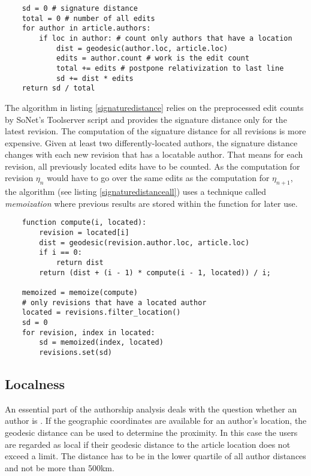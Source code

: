 \begin{lstlisting}
	sd = 0 # signature distance
	total = 0 # number of all edits
	for author in article.authors:
		if loc in author: # count only authors that have a location
			dist = geodesic(author.loc, article.loc)
			edits = author.count # work is the edit count
			total += edits # postpone relativization to last line 
			sd += dist * edits
	return sd / total
\end{lstlisting}

The algorithm in listing \ref{signaturedistance} relies on the preprocessed edit counts by SoNet's Toolserver script and provides the signature distance only for the latest revision. 
The computation of the signature distance for all revisions is more expensive.
Given at least two differently-located authors, the signature distance changes with each new revision that has a locatable author.
That means for each revision, all previously located edits have to be counted.
As the computation for revision $\eta_{n}$ would have to go over the same edits as the computation for $\eta_{n+1}$, the algorithm (see listing \ref{signaturedistanceall}) uses a technique called \emph{memoization} where previous results are stored within the function for later use.

\begin{lstlisting}
	function compute(i, located):
		revision = located[i]
		dist = geodesic(revision.author.loc, article.loc)
		if i == 0:
			return dist
		return (dist + (i - 1) * compute(i - 1, located)) / i;
		
	memoized = memoize(compute)
	# only revisions that have a located author
	located = revisions.filter_location() 
	sd = 0
	for revision, index in located:
		sd = memoized(index, located)
		revisions.set(sd)
\end{lstlisting}

\subsection{Localness}\label{sub:localness}

An essential part of the authorship analysis deals with the question whether an author is .
If the geographic coordinates are available for an author's location, the geodesic distance can be used to determine the proximity. 
In this case the users are regarded as local if their geodesic distance to the article location does not exceed a limit.
The distance has to be in the lower quartile of all author distances and not be more than 500km.

